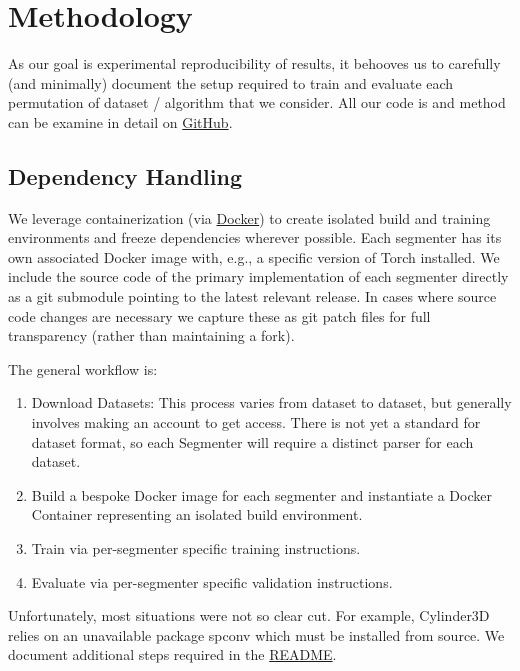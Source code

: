 \section{Methodology}
\label{chap:methodology}

As our goal is experimental reproducibility of results, it behooves us to carefully (and minimally) document the setup required to train and evaluate each permutation of dataset / algorithm that we consider. All our code is and method can be examine in detail on \href{https://github.com/danielmohansahu/benchmarking-3d-semantic-segmentation}{GitHub}.

\subsection{Dependency Handling}
\label{dependency-handling}

We leverage containerization (via \href{https://www.docker.com/}{Docker}) to create isolated build and training environments and freeze dependencies wherever possible. Each segmenter has its own associated Docker image with, e.g., a specific version of Torch installed. We include the source code of the primary implementation of each segmenter directly as a git submodule pointing to the latest relevant release. In cases where source code changes are necessary we capture these as git patch files for full transparency (rather than maintaining a fork).

The general workflow is:
\begin{enumerate}
  \item Download Datasets: This process varies from dataset to dataset, but generally involves making an account to get access. There is not yet a standard for dataset format, so each Segmenter will require a distinct parser for each dataset.
  \item Build a bespoke Docker image for each segmenter and instantiate a Docker Container representing an isolated build environment.
  \item Train via per-segmenter specific training instructions.
  \item Evaluate via per-segmenter specific validation instructions.
\end{enumerate}

Unfortunately, most situations were not so clear cut. For example, Cylinder3D relies on an unavailable package spconv which must be installed from source. We document additional steps required in the \href{https://github.com/danielmohansahu/benchmarking-3d-semantic-segmentation/blob/main/README.md}{README}.

